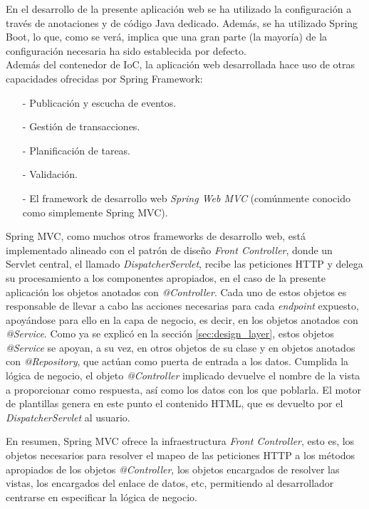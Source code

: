 \documentclass[a4paper]{article}
\begin{document}
    En el desarrollo de la presente aplicación web se ha utilizado la configuración a través de anotaciones y de código Java dedicado. Además, se ha utilizado Spring Boot, lo que, como se verá, implica que una gran parte (la mayoría) de la configuración necesaria ha sido establecida por defecto.
    \\
    
    Además del contenedor de IoC, la aplicación web desarrollada hace uso de otras capacidades ofrecidas por Spring Framework:
    
    \begin{itemize}
    	\item[-] Publicación y escucha de eventos.
    	\item[-] Gestión de transacciones.
    	\item[-] Planificación de tareas.
    	\item[-] Validación.
    	\item[-] El framework de desarrollo web \emph{Spring Web MVC} (comúnmente conocido como simplemente Spring MVC).
    \end{itemize}
    
    Spring MVC, como muchos otros frameworks de desarrollo web, está implementado alineado con el patrón de diseño \emph{Front Controller}, donde un Servlet central, el llamado \emph{DispatcherServlet}, recibe las peticiones HTTP y delega su procesamiento a los componentes apropiados, en el caso de la presente aplicación los objetos anotados con \emph{@Controller}. Cada uno de estos objetos es responsable de llevar a cabo las acciones necesarias para cada \emph{endpoint} expuesto, apoyándose para ello en la capa de negocio, es decir, en los objetos anotados con \emph{@Service}. Como ya se explicó en la sección \ref{sec:design_layer}, estos objetos \emph{@Service} se apoyan, a su vez, en otros objetos de su clase y en objetos anotados con \emph{@Repository}, que actúan como puerta de entrada a los datos. Cumplida la lógica de negocio, el objeto \emph{@Controller} implicado devuelve el nombre de la vista a proporcionar como respuesta, así como los datos con los que poblarla. El motor de plantillas genera en este punto el contenido HTML, que es devuelto por el \emph{DispatcherServlet} al usuario.
    
    En resumen, Spring MVC ofrece la infraestructura \emph{Front Controller}, esto es, los objetos necesarios para resolver el mapeo de las peticiones HTTP a los métodos apropiados de los objetos \emph{@Controller}, los objetos encargados de resolver las vistas, los encargados del enlace de datos, etc, permitiendo al desarrollador centrarse en especificar la lógica de negocio.
    
\end{document}
